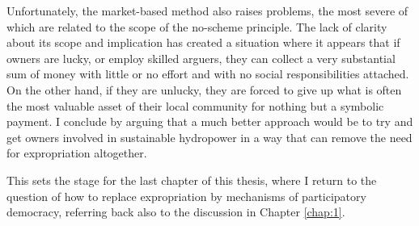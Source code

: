 Unfortunately, the market-based method also raises problems, the most severe of which are related to the scope of the no-scheme principle. The lack of clarity about its scope and implication has created a situation where it appears that if owners are lucky, or employ skilled arguers, they can collect a very substantial sum of money with little or no effort and with no social responsibilities attached. On the other hand, if they are unlucky, they are forced to give up what is often the most valuable asset of their local community for nothing but a symbolic payment. I conclude by arguing that a much better approach would be to try and get owners involved in sustainable hydropower in a way that can remove the need for expropriation altogether. 

This sets the stage for the last chapter of this thesis, where I return to the question of how to replace expropriation by mechanisms of participatory democracy, referring back also to the discussion in Chapter \ref{chap:1}.

